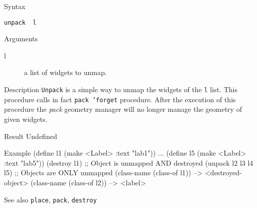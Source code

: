 %
%


\begin{schemedoc}{Syntax}
\begin{verbatim}
unpack  l
\end{verbatim}
\end{schemedoc}

\begin{schemedoc}{Arguments}
\begin{description}
\item[l] a list of widgets to unmap.
\end{description}
\end{schemedoc}

\begin{schemedoc}{Description}
{\tt Unpack} is a simple way to unmap the widgets of the {\tt l} list. 
This procedure calls in fact {\tt pack 'forget} procedure. After the execution
of this procedure the {\em pack} geometry manager will no longer manage
the geometry of given widgets.
\end{schemedoc}

\begin{schemedoc}{Result}
Undefined
\end{schemedoc}

\begin{schemedoc}{Example}
(define l1 (make <Label> :text "lab1"))
...
(define l5 (make <Label> :text "lab5"))
(destroy l1)             ;; Object is unmapped AND destroyed
(unpack l2 l3 l4 l5)      ;; Objects are ONLY unmapped
(class-name (class-of l1))
        --> <destroyed-object>
(class-name (class-of l2))
        --> <label>
\end{schemedoc}

%

\begin{schemedoc}{See also}
{\tt place}, {\tt pack}, {\tt destroy}
\end{schemedoc}

